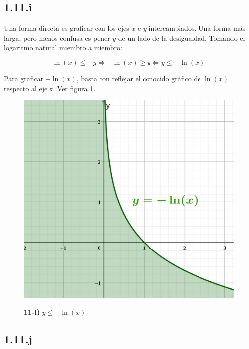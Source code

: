 \documentclass{article}
\begin{document}
\subsection*{1.11.i}
\label{subsec:1.11.i}

Una forma directa es graficar con los ejes $x$ e $y$ intercambiados. Una forma más larga, pero menos confusa es poner $y$ de un lado de la desigualdad. Tomando el logaritmo natural miembro a miembro:

\begin{equation}
\ln (x) \leq -y \Leftrightarrow -\ln(x) \geq y \Leftrightarrow y \leq -\ln(x)
\end{equation}

Para graficar $-\ln(x)$, basta con reflejar el conocido gráfico de $\ln(x)$ respecto al eje x. Ver figura \ref{fig:1-11-i}.

\begin{figure}[ht]
\caption{\textbf{11-i)} $y \leq -\ln(x)$}
\includegraphics[scale=0.75]{../img/exercises/guide_01/11_i.png} 
\centering
\label{fig:1-11-i}
\end{figure}

\subsection*{1.11.j}
\label{subsec:1.11.j}
\end{document}
